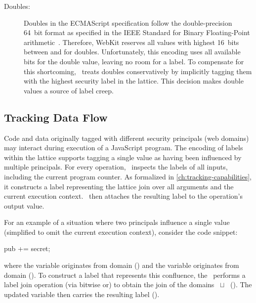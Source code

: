 \begin{description}
\item[Doubles:]
Doubles in the ECMAScript specification follow the double-precision 64~bit format as specified in the IEEE Standard for Binary Floating-Point arithmetic~\cite{ieee754}.
Therefore, WebKit reserves all values with highest 16~bits between  and  for doubles.
Unfortunately, this encoding uses all available bits for the double value, leaving no room for a label.
To compensate for this shortcoming, \JitFlow\ treats doubles conservatively by implicitly tagging them with the highest security label in the lattice.
This decision makes double values a source of label creep.

\end{description}

\subsection{Tracking Data Flow}
\label{sec:jitflow-tracking-dataflow}

Code and data originally tagged with different security principals (web domains) may interact during execution of a JavaScript program.
The encoding of labels within the lattice supports tagging a single value as having been influenced by multiple principals.
For every operation, \JitFlow\ inspects the labels of all inputs, including the current program counter.
As formalized in \autoref{ch:tracking-capabilities}, it constructs a label representing the lattice join over all arguments and the current execution context.
\JitFlow\ then attaches the resulting label to the operation's output value.

For an example of a situation where two principals influence a single value (simplified to omit the current execution context), consider the code snippet:

\begin{snippet}
pub += secret;
\end{snippet}

where the variable  originates from domain  () and the variable  originates from domain  ().
To construct a label that represents this confluence, the \JitFlow\ performs a label join operation (via bitwise or) to obtain the join of the domains ~$\sqcup$~ ().
The updated variable  then carries the resulting label ().


